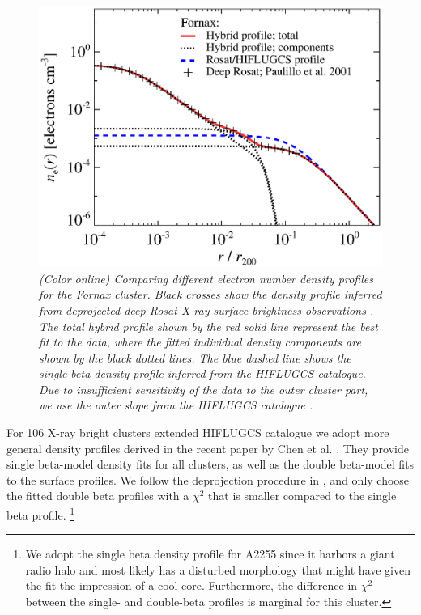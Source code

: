 \documentclass[10pt,aps,pra,reprint,amsmath,amsfonts,amssymb,showpacs,nofootinbib,floatfix]{revtex4-1}
\begin{document}
\begin{figure}%
 \includegraphics[width=0.99\columnwidth]{figures/dens.fornax.bw.eps}
 \caption{\it (Color online) Comparing different electron number
   density profiles for the Fornax cluster. Black crosses show the
   density profile inferred from deprojected deep Rosat X-ray surface
   brightness observations \protect \cite{2002ApJ...565..883P}. The
   total hybrid profile shown by the red solid line represent the best
   fit to the data, where the fitted individual density components are
   shown by the black dotted lines. The blue dashed line shows the
   single beta density profile inferred from the HIFLUGCS
   catalogue. Due to insufficient sensitivity of the data to the outer
   cluster part, we use the outer slope from the HIFLUGCS catalogue
   \cite{2007A&A...466..805C}.}
 \label{fig:dens_fornax}
\end{figure}

For 106 X-ray bright clusters extended HIFLUGCS catalogue we adopt
more general density profiles derived in the recent paper by Chen et
al. \cite{2007A&A...466..805C}. They provide single beta-model density
fits for all clusters, as well as the double beta-model fits to the
surface profiles. We follow the deprojection procedure in
\cite{2004A&A...413...17P}, and only choose the fitted double beta
profiles with a $\chi^2$ that is smaller compared to the single beta
profile. \footnote{We adopt the single beta density profile for A2255
  since it harbors a giant radio halo and most likely has a disturbed
  morphology that might have given the fit the impression of a cool
  core. Furthermore, the difference in $\chi^2$ between the single-
  and double-beta profiles is marginal for this cluster.}
\end{document}
